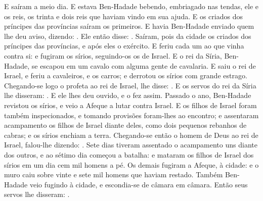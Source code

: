 {  E saíram a meio dia. E estava Ben-Hadade bebendo, embriagado nas tendas, ele e os reis, os trinta e dois reis que haviam vindo em sua ajuda.
  E os criados dos príncipes das províncias saíram os primeiros. E havia Ben-Hadade enviado quem lhe deu aviso, dizendo: .
  Ele então disse: .
  Saíram, pois da cidade os criados dos príncipes das províncias, e após eles o exército.
  E feriu cada um ao que vinha contra si: e fugiram os sírios, seguindo-os os de Israel. E o rei da Síria, Ben-Hadade, se escapou em um cavalo com alguma gente de cavalaria.
  E saiu o rei de Israel, e feriu a cavaleiros, e os carros; e derrotou os sírios com grande estrago.
  Chegando-se logo o profeta ao rei de Israel, lhe disse: .
  E os servos do rei da Síria lhe disseram: . E ele lhes deu ouvido, e o fez assim.
  Passado o ano, Ben-Hadade revistou os sírios, e veio a Afeque a lutar contra Israel.
  E os filhos de Israel foram também inspecionados, e tomando provisões foram-lhes ao encontro; e assentaram acampamento os filhos de Israel diante deles, como dois pequenos rebanhos de cabras; e os sírios enchiam a terra.
  Chegando-se então o homem de Deus ao rei de Israel, falou-lhe dizendo: .
  Sete dias tiveram assentado o acampamento uns diante dos outros, e ao sétimo dia começou a batalha: e mataram os filhos de Israel dos sírios em um dia cem mil homens a pé.
  Os demais fugiram a Afeque, à cidade: e o muro caiu sobre vinte e sete mil homens que haviam restado. Também Ben-Hadade veio fugindo à cidade, e escondia-se de câmara em câmara.
  Então seus servos lhe disseram: .
}
